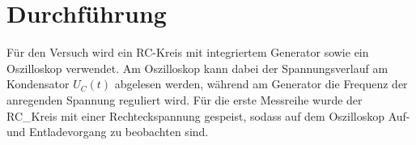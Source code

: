 \section{Durchführung}
Für den Versuch wird ein RC-Kreis mit integriertem Generator sowie ein Oszilloskop verwendet. Am Oszilloskop kann dabei der
Spannungsverlauf am Kondensator $U_C(t)$ abgelesen werden, während am Generator die Frequenz der anregenden Spannung reguliert wird.
Für die erste Messreihe wurde der RC_Kreis mit einer Rechteckspannung gespeist, sodass auf dem Oszilloskop Auf- und Entladevorgang 
zu beobachten sind.
